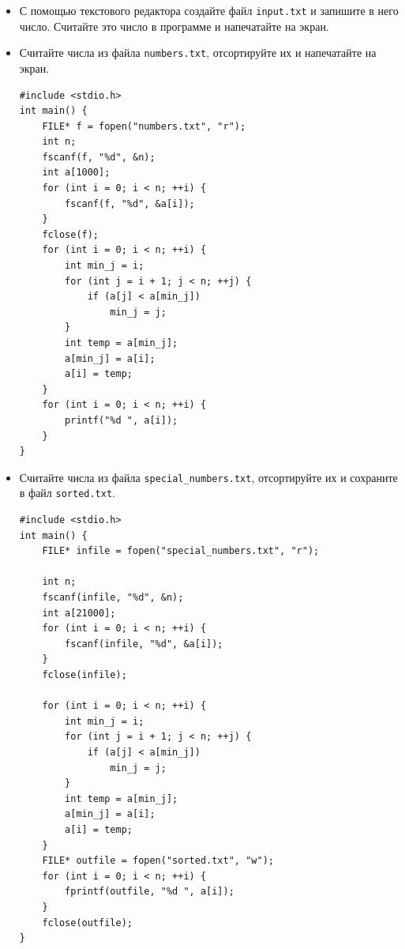 \documentclass{article}
\begin{document}
\begin{itemize}
\item С помощью текстового редактора создайте файл \texttt{input.txt} и запишите в него число. Считайте это число в программе и напечатайте на экран.
\item Считайте числа из файла \texttt{numbers.txt}, отсортируйте их и напечатайте на экран.
\begin{lstlisting}[backgroundcolor = \color{solcolor}]
#include <stdio.h>
int main() {
    FILE* f = fopen("numbers.txt", "r");
    int n;
    fscanf(f, "%d", &n);
    int a[1000];
    for (int i = 0; i < n; ++i) {
        fscanf(f, "%d", &a[i]);
    }
    fclose(f);
    for (int i = 0; i < n; ++i) {
        int min_j = i;
        for (int j = i + 1; j < n; ++j) {
            if (a[j] < a[min_j])
                min_j = j;
        }
        int temp = a[min_j];
        a[min_j] = a[i];
        a[i] = temp;
    }
    for (int i = 0; i < n; ++i) {
        printf("%d ", a[i]);
    } 
}
\end{lstlisting}
\item Считайте числа из файла \texttt{special\_numbers.txt}, отсортируйте их и сохраните в файл \texttt{sorted.txt}.
\begin{lstlisting}[backgroundcolor = \color{solcolor}]
#include <stdio.h>
int main() {
    FILE* infile = fopen("special_numbers.txt", "r");
    
    int n;
    fscanf(infile, "%d", &n);
    int a[21000];
    for (int i = 0; i < n; ++i) {
        fscanf(infile, "%d", &a[i]);
    }
    fclose(infile);
    
    for (int i = 0; i < n; ++i) {
        int min_j = i;
        for (int j = i + 1; j < n; ++j) {
            if (a[j] < a[min_j])
                min_j = j;
        }
        int temp = a[min_j];
        a[min_j] = a[i];
        a[i] = temp;
    }
    FILE* outfile = fopen("sorted.txt", "w");
    for (int i = 0; i < n; ++i) {
        fprintf(outfile, "%d ", a[i]);
    } 
    fclose(outfile);
}
\end{lstlisting}
\end{itemize}
\end{document}
